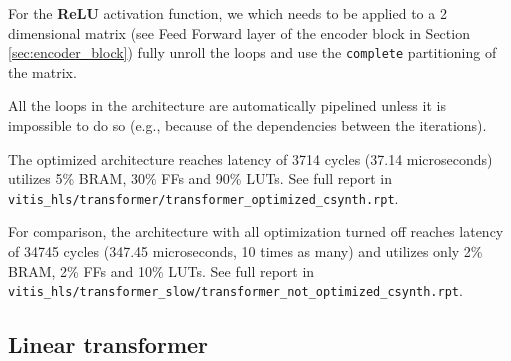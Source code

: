 \documentclass[a4paper, twoside]{report}
\theoremstyle{definition}
\numberwithin{equation}{section}
\begin{document}
For the \textbf{ReLU} activation function, we which needs to be applied to
a 2 dimensional matrix (see Feed Forward layer of the encoder block in Section \ref{sec:encoder_block})
fully unroll the loops and use the \texttt{complete} partitioning of the matrix.

All the loops in the architecture are automatically pipelined unless
it is impossible to do so (e.g., because of the dependencies between the iterations).


The optimized architecture reaches latency of 3714 cycles (37.14 microseconds) utilizes 5\% BRAM, 30\% FFs and 90\% LUTs.
\newline
See full report in \texttt{vitis\_hls/transformer/transformer\_optimized\_csynth.rpt}.

For comparison, the architecture with all optimization turned off
reaches latency of 34745 cycles (347.45 microseconds, 10 times as many) and utilizes only 2\% BRAM, 2\% FFs and 10\% LUTs.
\newline
See full report in \texttt{vitis\_hls/transformer\_slow/transformer\_not\_optimized\_csynth.rpt}.

\subsection{Linear transformer}






\end{document}
